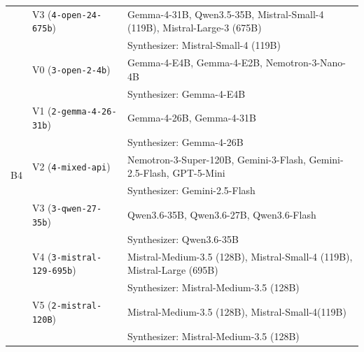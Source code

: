 \begin{table}[ht]
\begin{tabularx}{\textwidth}{llX}
    & V3 (\texttt{4-open-24-675b})         & Gemma-4-31B, Qwen3.5-35B, Mistral-Small-4 (119B), Mistral-Large-3 (675B) \\
    &                                      & Synthesizer: Mistral-Small-4 (119B) \\
    \midrule
    \multirow{10}{*}{B4} & V0 (\texttt{3-open-2-4b})         & Gemma-4-E4B, Gemma-4-E2B, Nemotron-3-Nano-4B \\
    &                                      & Synthesizer: Gemma-4-E4B \\
    & V1 (\texttt{2-gemma-4-26-31b})       & Gemma-4-26B, Gemma-4-31B \\
    &                                      & Synthesizer: Gemma-4-26B \\
    & V2 (\texttt{4-mixed-api})            & Nemotron-3-Super-120B, Gemini-3-Flash, Gemini-2.5-Flash, GPT-5-Mini \\
    &                                      & Synthesizer: Gemini-2.5-Flash \\
    & V3 (\texttt{3-qwen-27-35b})    & Qwen3.6-35B, Qwen3.6-27B, Qwen3.6-Flash \\
    &                                      & Synthesizer: Qwen3.6-35B \\
    & V4 (\texttt{3-mistral-129-695b})     & Mistral-Medium-3.5 (128B), Mistral-Small-4 (119B), Mistral-Large (695B) \\
    &                                      & Synthesizer: Mistral-Medium-3.5 (128B) \\
    & V5 (\texttt{2-mistral-120B})         & Mistral-Medium-3.5 (128B), Mistral-Small-4(119B) \\
    &                                      & Synthesizer: Mistral-Medium-3.5 (128B)\\
    \bottomrule
  \end{tabularx}
\end{table}